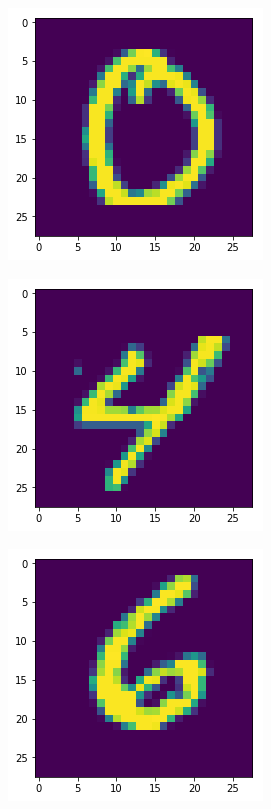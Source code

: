 \begin{figure}[H]
\centering
\begin{subfigure}{.3\linewidth}
    \centering
    \includegraphics[scale=0.4]{chapter_3_figures/mnist_0.png}
\end{subfigure}
    \hfill
\begin{subfigure}{.3\linewidth}
    \centering
    \includegraphics[scale=0.4]{chapter_3_figures/mnist_4.png}
\end{subfigure}
   \hfill
\begin{subfigure}{.3\linewidth}
    \centering
    \includegraphics[scale=0.4]{chapter_3_figures/mnist_6.png}
\end{subfigure}


\end{figure}

